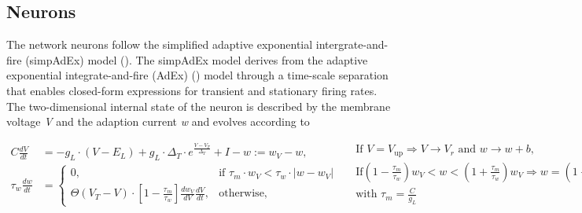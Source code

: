 \subsection*{Neurons}

The network neurons follow the simplified adaptive exponential intergrate-and-fire (simpAdEx) model (\cite{hertag12ana}). The simpAdEx model derives from the adaptive exponential integrate-and-fire (AdEx) (\cite{brette05ada}) model through a time-scale separation that enables closed-form expressions for transient and stationary firing rates. \\

The two-dimensional internal state of the neuron is described by the membrane voltage \textit{V} and the adaption current \textit{w} and evolves according to

\begin{subequations}
\label{eq:Membrane}
\begin{align}
    C \frac{dV}{dt} &= - g_{L} \cdot (V - E_{L}) + g_{L} \cdot \Delta_{T} \cdot e^{\frac{V - V_{T}}{\Delta_{T}}} + I - w := w_V - w,\label{eqn:dvdt}\\
    \tau_w \frac{dw}{dt}  &=
\begin{cases}
    0, & \text{if } \tau_m \cdot w_V < \tau_w \cdot |w - w_V |\\
    \Theta (V_T - V) \cdot \left[ 1 - \frac{\tau_m}{\tau_w}\right] \frac{dw_V}{dV}\frac{dV}{dt},              & \text{otherwise},
    \end{cases} \label{eqn:dwdt}
\end{align}
\begin{align}
&\text{If } V = V_{\text{up}} \Rightarrow V \rightarrow V_{r} \text{ and } w \rightarrow w + b \text{,}\\ 
&\text{If} \left( 1 - \frac{\tau_m}{\tau_w} \right) w_V < w <  \left( 1 + \frac{\tau_m}{\tau_w} \right)w_V \Rightarrow w = \left( 1 - \frac{\tau_m}{\tau_w} \right) w_V,\\
&\text{with } \tau_m = \frac{C}{g_L} \nonumber
\end{align}
\end{subequations}

